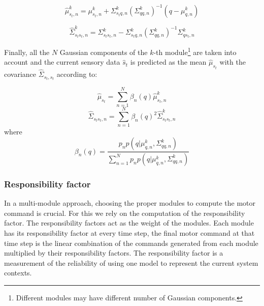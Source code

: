 \begin{equation}
{
\hat{\mu}_{s_t,n}^k = {\mu}_{s_t,n}^k + \Sigma_{{s_t}q,n}^k({\Sigma}_{qq,n}^k)^{-1}(q-{\mu}_{q,n}^k)
}
\end{equation}

\begin{equation}
{
\hat{\Sigma}_{{s_t}{s_t},n}^k = {\Sigma}_{{s_t}{s_t},n}^k - {\Sigma}_{{s_t}q,n}^k({\Sigma}_{qq,n}^k)^{-1}{\Sigma}_{q{s_t},n}^k
}
\end{equation}


Finally, all the $N$ Gaussian components of the $k$-th module\footnote{Different modules may have different number of Gaussian components.} are taken into account and the current sensory data $\hat{s}_t$ is predicted as the mean $\hat{\mu}_{s_t}$ with the covariance $\hat{\Sigma}_{s_t,s_t}$ according to:

\begin{equation}
{
\hat{\mu}_{s_t} = \sum_{n=1}^N{\beta_n(q)}\hat{\mu}_{s_t,n}^k
}
\end{equation}
\begin{equation}
{
\hat{\Sigma}_{{s_t}{s_t},n} = \sum_{n=1}^N{\beta_n(q)}^2\hat{\Sigma}_{{s_t}{s_t},n}^k
}
\end{equation}
where
\begin{equation}
{
\beta_n(q) = \frac{p_{n}p(q|{\mu}_{q,n}^k,{\Sigma}_{qq,n}^k)}
{\sum_{n=1}^N{p_n}p(q|{\mu}_{q,n}^k,{\Sigma}_{qq,n}^k)}
}
\end{equation}



\subsubsection{Responsibility factor}
\label{sec:rf}

In a multi-module approach, choosing the proper modules to compute the motor command is crucial. For this we rely on the computation of the responsibility factor. The responsibility factors act as the weight of the modules. Each module has its responsibility factor at every time step, the final motor command at that time step is the linear combination of the commands generated from each module multiplied by their responsibility factors.
The responsibility factor is a measurement of the reliability of using one model to represent the current system contexts.
%
%


